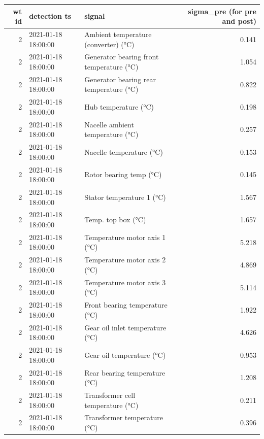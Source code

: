 \begin{tabular}{rllr}
\toprule
wt id & detection ts & signal & sigma\_pre (for pre and post) \\
\midrule
2 & 2021-01-18 18:00:00 & Ambient temperature (converter) (°C) & 0.141 \\
2 & 2021-01-18 18:00:00 & Generator bearing front temperature (°C) & 1.054 \\
2 & 2021-01-18 18:00:00 & Generator bearing rear temperature (°C) & 0.822 \\
2 & 2021-01-18 18:00:00 & Hub temperature (°C) & 0.198 \\
2 & 2021-01-18 18:00:00 & Nacelle ambient temperature (°C) & 0.257 \\
2 & 2021-01-18 18:00:00 & Nacelle temperature (°C) & 0.153 \\
2 & 2021-01-18 18:00:00 & Rotor bearing temp (°C) & 0.145 \\
2 & 2021-01-18 18:00:00 & Stator temperature 1 (°C) & 1.567 \\
2 & 2021-01-18 18:00:00 & Temp. top box (°C) & 1.657 \\
2 & 2021-01-18 18:00:00 & Temperature motor axis 1 (°C) & 5.218 \\
2 & 2021-01-18 18:00:00 & Temperature motor axis 2 (°C) & 4.869 \\
2 & 2021-01-18 18:00:00 & Temperature motor axis 3 (°C) & 5.114 \\
2 & 2021-01-18 18:00:00 & Front bearing temperature (°C) & 1.922 \\
2 & 2021-01-18 18:00:00 & Gear oil inlet temperature (°C) & 4.626 \\
2 & 2021-01-18 18:00:00 & Gear oil temperature (°C) & 0.953 \\
2 & 2021-01-18 18:00:00 & Rear bearing temperature (°C) & 1.208 \\
2 & 2021-01-18 18:00:00 & Transformer cell temperature (°C) & 0.211 \\
2 & 2021-01-18 18:00:00 & Transformer temperature (°C) & 0.396 \\
\bottomrule
\end{tabular}
